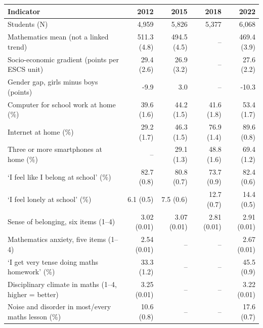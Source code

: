 \begin{tabular}{@{}p{6.6cm}rrrr@{}}
\toprule
Indicator & 2012 & 2015 & 2018 & 2022 \\
\midrule
Students (N) & 4,959 & 5,826 & 5,377 & 6,068 \\
Mathematics mean (not a linked trend) & 511.3 (4.8) & 494.5 (4.5) & -- & 469.4 (3.9) \\
Socio-economic gradient (points per ESCS unit) & 29.4 (2.6) & 26.9 (3.2) & -- & 27.6 (2.2) \\
Gender gap, girls minus boys (points) & -9.9 & 3.0 & -- & -10.3 \\
Computer for school work at home (\%) & 39.6 (1.6) & 44.2 (1.5) & 41.6 (1.8) & 53.4 (1.7) \\
Internet at home (\%) & 29.2 (1.7) & 46.3 (1.5) & 76.9 (1.4) & 89.6 (0.8) \\
Three or more smartphones at home (\%) & -- & 29.1 (1.3) & 48.8 (1.6) & 69.4 (1.2) \\
`I feel like I belong at school' (\%) & 82.7 (0.8) & 80.8 (0.7) & 73.7 (0.9) & 82.4 (0.6) \\
`I feel lonely at school' (\%) & 6.1 (0.5) & 7.5 (0.6) & 12.7 (0.7) & 14.4 (0.5) \\
Sense of belonging, six items (1--4) & 3.02 (0.01) & 3.07 (0.01) & 2.81 (0.01) & 2.91 (0.01) \\
Mathematics anxiety, five items (1--4) & 2.54 (0.01) & -- & -- & 2.67 (0.01) \\
`I get very tense doing maths homework' (\%) & 33.3 (1.2) & -- & -- & 45.5 (0.9) \\
Disciplinary climate in maths (1--4, higher = better) & 3.25 (0.01) & -- & -- & 3.22 (0.01) \\
Noise and disorder in most/every maths lesson (\%) & 10.6 (0.8) & -- & -- & 17.6 (0.7) \\
\bottomrule
\end{tabular}
